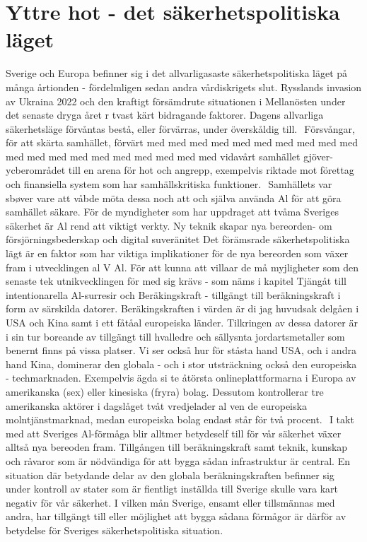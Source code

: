 {{{{{\section*{Yttre hot - det säkerhetspolitiska läget}
Sverige och Europa befinner sig i det allvarligasaste säkerhetspolitiska läget på många årtionden - fördelmligen sedan andra vårdiskrigets slut. Rysslands invasion av Ukraina 2022 och den kraftigt försämdrute situationen i Mellanösten under det senaste dryga året r tvast kärt bidragande faktorer. Dagens allvarliga säkerhetsläge förvåntas bestå, eller förvärras, under överskåldig till. \({ }^{}\) Försvångar, för att skärta samhället, förvärt med med med med med med med med med med med med med med med med med med med med vidavårt samhället gjöver-ycberområdet till en arena för hot och angrepp, exempelvis riktade mot förettag och finansiella system som har samhällskritiska funktioner. \({ }^{}\) Samhällets var sbøver vare att våbde möta dessa noch att och själva använda Al för att göra samhället säkare. För de myndigheter som har uppdraget att tvåma Sveriges säkerhet är Al rend att viktigt verkty.
Ny teknik skapar nya bereorden- om försjörningsbederskap och digital suveränitet Det förämsrade säkerhetspolitiska lägt är en faktor som har viktiga implikationer för de nya bereorden som växer fram i utvecklingen al \(\mathrm{V}\) Al. För att kunna att villaar de må myjligheter som den senaste tek utnikvecklingen för med sig krävs - som näms i kapitel Tjängåt till intentionarella Al-surresir och Beräkingskraft - tillgängt till beräkningskraft i form av särskilda datorer. Beräkingskraften i värden är di jag huvudsak delgåen i USA och Kina samt i ett fåtåal europeiska länder. Tilkringen av dessa datorer är i sin tur boreande av tillgängt till hvalledre och sällysnta jordartsmetaller som benernt finns på vissa platser. Vi ser också hur för ståsta hand USA, och i andra hand
Kina, dominerar den globala - och i stor utsträckning också den europeiska - techmarknaden. Exempelvis ägda si te åtörsta onlineplattformarna i Europa av amerikanska (sex) eller kinesiska (fryra) bolag. Dessutom kontrollerar tre amerikanska aktörer i dagslåget tvåt vredjelader al ven de europeiska molntjänstmarknad, medan europeiska bolag endast står för två procent. \({ }^{}\)
I takt med att Sveriges Al-förmåga blir alltmer betydeself till för vår säkerhet växer alltså nya bereoden fram. Tillgången till beräkningskraft samt teknik, kunskap och råvaror som är nödvändiga för att bygga sådan infrastruktur är central. En situation där betydande delar av den globala beräkningskraften befinner sig under kontroll av stater som är fientligt inställda till Sverige skulle vara kart negativ för vår säkerhet. I vilken mån Sverige, ensamt eller tillsmännas med andra, har tillgängt till eller möjlighet att bygga sådana förmågor är därför av betydelse för Sveriges säkerhetspolitiska situation.
}}}}}
